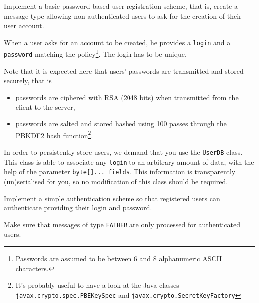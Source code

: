 \documentclass[a4paper,11pt]{article}
\begin{document}
\begin{exo}
Implement a basic password-based user registration scheme, that is, create a message type allowing non authenticated users to ask for the creation of their user account.
\end{exo}

When a user asks for an account to be created, he provides a \texttt{login} and a \texttt{password} matching the policy\footnote{Passwords are assumed to be between 6 and 8 alphanumeric ASCII characters.}. The login has to be unique. 

Note that it is expected here that users' passwords are transmitted and stored securely, that is
\begin{itemize}
  \item passwords are ciphered with RSA (2048 bits) when transmitted from the client to the server,
  \item passwords are salted and stored hashed using 100 passes through the PBKDF2 hash function\footnote{It's probably useful to have a look at the Java classes \texttt{javax.crypto.spec.PBEKeySpec} and \texttt{javax.crypto.SecretKeyFactory}}.
\end{itemize}
In order to persistently store users, we demand that you use the \texttt{UserDB} class. This class is able to associate any \texttt{login} to an arbitrary amount of data, with the help of the parameter \lstinline|byte[]... fields|. This information is transparently (un)serialised for you, so no modification of this class should be required.

\begin{exo}
Implement a simple authentication scheme so that registered users can authenticate providing their login and password.
\end{exo}

\begin{exo}
Make sure that messages of type \texttt{FATHER} are only processed for authenticated users.
\end{exo}

\end{document}
